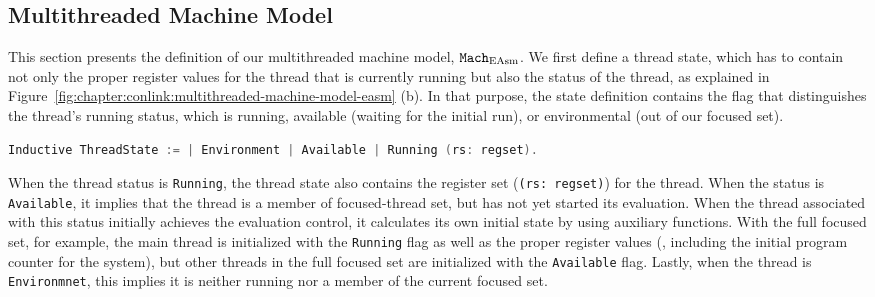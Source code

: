 \subsection{Multithreaded Machine Model}
\label{chapter:linking:subsec:multithreaded-machine-model}

This section presents the definition of our multithreaded machine model,
${\mathrm{\texttt{Mach}}}_{\mathrm{EAsm}}$.
We first define a thread state,
which has to contain not only the proper register values for the thread that is currently running  but also 
the status of the thread, as explained in Figure~\ref{fig:chapter:conlink:multithreaded-machine-model-easm} (b).
In that purpose, the state definition contains the flag that distinguishes the thread's running status,
which is running, available (waiting  for the initial run), 
or environmental (out of our focused set).
\begin{lstlisting}[language=C]
Inductive ThreadState := | Environment | Available | Running (rs: regset).
\end{lstlisting}
When the thread status is \lstinline$Running$, the thread state also contains the register set (\lstinline$(rs: regset)$) for the thread. 
%
When the status is \lstinline$Available$, it implies that the thread is a member of focused-thread set, but has not yet started its evaluation.
When the thread associated with this status initially achieves the evaluation control, it calculates its own initial state by using 
auxiliary functions. 
With the full focused set, for example, the main thread is initialized with the \lstinline$Running$ flag as well as the proper register values (\ie, including the initial program counter for the system),
but other threads in the full focused set are initialized with    the \lstinline$Available$ flag.
Lastly, when the thread is  \lstinline$Environmnet$, 
this implies it is neither running nor a member of the current focused set. 
%


